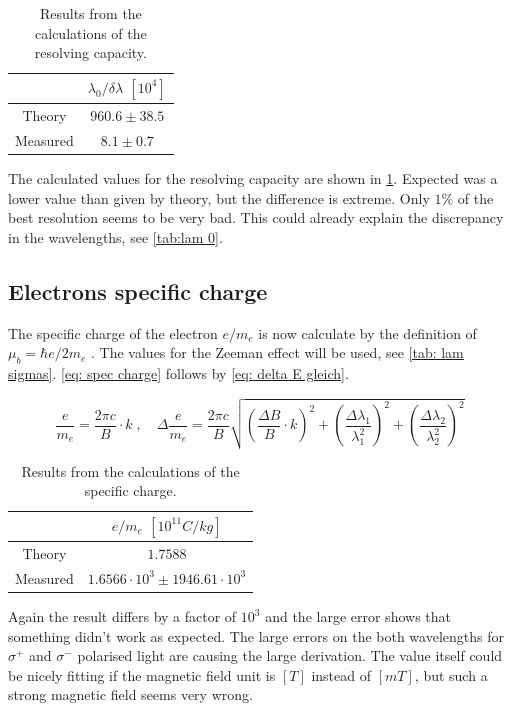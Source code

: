\documentclass[]{article}
\begin{document}
\begin{table}[H]
\centering
\begin{tabular}{c|c}
&$\lambda_0/\delta\lambda$ $[10^4]$\\ \hline\hline
Theory & $960.6 \pm 38.5$    \\ \hline
Measured & $8.1 \pm 0.7$  
\end{tabular}
\caption{Results from the calculations of the resolving capacity.}
\label{tab: res cap results}
\end{table}

The calculated values for the resolving capacity are shown in \ref{tab: res cap results}. Expected was a lower value than given by theory, but the difference is extreme. Only $1\%$ of the best resolution seems to be very bad. This could already explain the discrepancy in the wavelengths, see \autoref{tab:lam 0}.


\subsection{Electrons specific charge}
The specific charge of the electron $e/m_e$ is now calculate by the definition of $\mu_b = \hbar e/2m_e$ . The values for the Zeeman effect will be used, see \autoref{tab: lam sigmas}. \autoref{eq: spec charge} follows by \autoref{eq: delta E gleich}.

\begin{equation}
\frac{e}{m_e} = \frac{2\pi c}{B} \cdot k \;,\quad \Delta \frac{e}{m_e} = \frac{2\pi c}{B} \sqrt{\left(\frac{\Delta B}{B}\cdot k \right)^2 + \left(\frac{\Delta\lambda_1}{\lambda_1^2}\right)^2 + \left(\frac{\Delta\lambda_2}{\lambda_2^2}\right)^2 }
\label{eq: spec charge}
\end{equation}

\begin{table}[H]
\centering
\begin{tabular}{c|c}
&$e/m_e$ $[10^{11} C/kg]$\\ \hline\hline
Theory & $ 1.7588 $    \\ \hline
Measured & $1.6566 \cdot 10^3 \pm 1946.61 \cdot 10^3 $  
\end{tabular}
\caption{Results from the calculations of the specific charge.}
\label{tab: e/me results}
\end{table}

Again the result differs by a factor of $10^3$ and the large error shows that something didn't work as expected. The large errors on the both wavelengths for $\sigma^+$ and $\sigma^-$ polarised light are causing the large derivation. The value itself could be nicely fitting if the magnetic field unit is $[T]$ instead of $[mT]$, but such a strong magnetic field seems very wrong.
\end{document}
